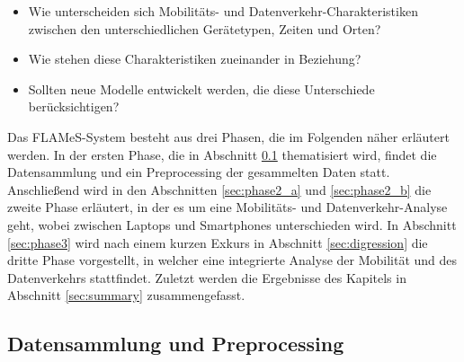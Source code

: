 \documentclass[12pt, a4paper]{article}
\begin{document}
\begin{itemize}
    \item Wie unterscheiden sich Mobilitäts- und Datenverkehr-Charakteristiken zwischen den unterschiedlichen Gerätetypen,
    Zeiten und Orten?
    \item Wie stehen diese Charakteristiken zueinander in Beziehung?
    \item Sollten neue Modelle entwickelt werden, die diese Unterschiede berücksichtigen?
\end{itemize}

Das FLAMeS-System besteht aus drei Phasen, die im Folgenden näher erläutert werden. In der ersten Phase, die in Abschnitt
\ref{sec:phase1} thematisiert wird, findet die Datensammlung und ein Preprocessing der gesammelten Daten statt.
Anschließend wird in den Abschnitten \ref{sec:phase2_a} und \ref{sec:phase2_b} die zweite Phase erläutert, 
in der es um eine Mobilitäts- und Datenverkehr-Analyse geht, wobei zwischen Laptops und Smartphones unterschieden wird. 
In Abschnitt \ref{sec:phase3} wird nach einem kurzen Exkurs in Abschnitt \ref{sec:digression} die dritte Phase vorgestellt, 
in welcher eine integrierte Analyse der Mobilität und des Datenverkehrs stattfindet. 
Zuletzt werden die Ergebnisse des Kapitels in Abschnitt \ref{sec:summary} zusammengefasst.


\subsection{Datensammlung und Preprocessing}
\label{sec:phase1}
\end{document}
